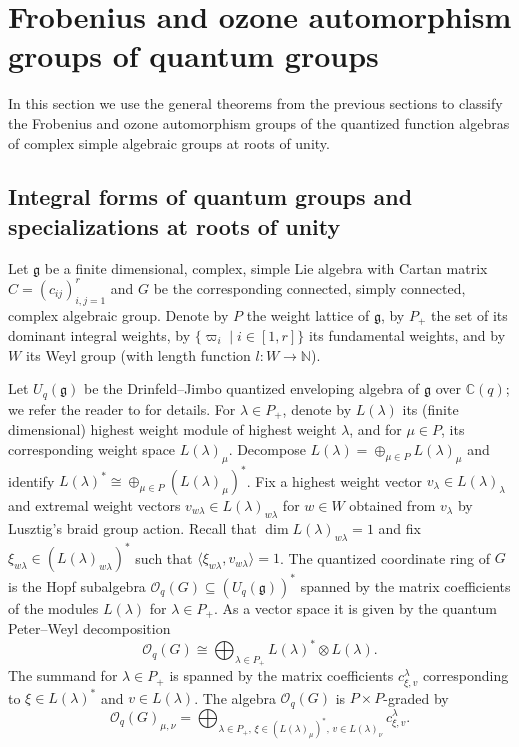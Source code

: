 \documentclass[11pt]{amsart}
\theoremstyle{plain}
\newcommand{\cleqn}{\setcounter{equation}{0}}
\newcommand{\clth}{\setcounter{theorem}{0}}
\newcommand {\sectionnew}[1]{\section{#1}\cleqn\clth}
\def \Cset {{\mathbb C}}
\def \Nset {{\mathbb N}}
\def \OO {{\mathcal{O}}}
\def \vpi {\varpi}
\def \la {\lambda}
\def \g  {\mathfrak{g}}   %
\begin{document}
\sectionnew{Frobenius and ozone automorphism groups of quantum groups}
\label{qgroups}
In this section we use the general theorems from the previous sections to classify the Frobenius and 
ozone automorphism groups of the quantized function
algebras of complex simple algebraic groups at roots of unity. 
\subsection{Integral forms of quantum groups and specializations at roots of unity}
\label{qg-forms}
Let $\g$ be a finite dimensional, complex, simple Lie algebra with Cartan matrix $C=(c_{ij})_{i,j=1}^r$ and $G$ be the corresponding connected, simply connected, complex algebraic group. 
Denote by $P$ the weight lattice of $\g$, by $P_+$ the set of its dominant integral weights, by $\{\vpi_i \mid i \in [1,r] \}$ its fundamental weights, and by $W$ its Weyl group (with length function $l : W \to \Nset$).

Let $U_q(\g)$ be the Drinfeld--Jimbo quantized enveloping algebra of $\g$ over $\Cset(q)$; we refer the reader to \cite{BrG,CP} for details. For $\la \in P_+$, denote by $L(\la)$ its (finite dimensional) highest weight module of highest weight $\la$, and for $\mu \in P$, its corresponding weight space $L(\la)_\mu$.
Decompose $L(\la) = \oplus_{\mu \in P} L(\la)_\mu$ and identify $L(\la)^* \cong \oplus_{\mu \in P} (L(\la)_\mu)^*$.
Fix a highest weight vector $v_\la \in L(\la)_\la$ and extremal weight vectors $v_{w \la} \in L(\la)_{w \la}$ for $w \in W$ obtained from $v_\la$ by Lusztig's braid group action. Recall that $\dim L(\la)_{w \la}=1$ and fix $\xi_{w \la} \in (L(\la)_{w \la})^*$ such that $\langle \xi_{w \la}, v_{w \la} \rangle =1$. The quantized coordinate ring of $G$ is the Hopf subalgebra $\OO_q(G) \subseteq (U_q(\g))^*$
spanned by the matrix coefficients of the modules $L(\la)$ for $\la \in P_+$. As a vector space it is given by the quantum Peter--Weyl decomposition 
\[
\OO_q(G) \cong \bigoplus_{\la \in P_+} L(\la)^* \otimes L(\la).
\]
The summand for $\la \in P_+$ is spanned by the matrix coefficients $c_{\xi, v}^\la$ corresponding to $\xi \in L(\la)^*$ 
and $v \in L(\la)$. The algebra $\OO_q(G)$ is 
$P \times P$-graded by 
\begin{equation}
\label{grading}
\OO_q(G)_{\mu, \nu} = \bigoplus_{\la \in P_+, \, \xi \in (L(\la)_\mu)^*, \, v \in L(\la)_\nu} c_{\xi, v}^\la. 
\end{equation}
\end{document}
